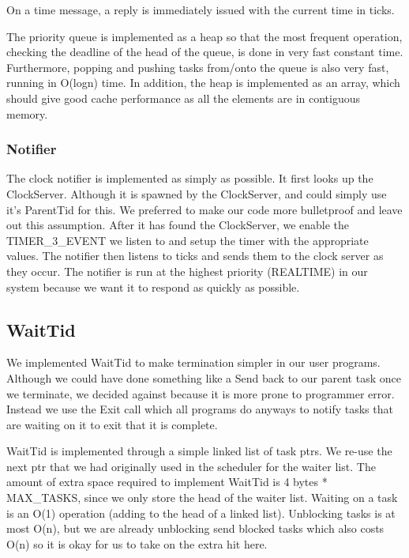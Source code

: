 \documentclass{article}
\begin{document}
On a time message, a reply is immediately issued with the current time in ticks.

The priority queue is implemented as a heap so that the most frequent operation, checking the deadline of the head of the queue, is done in very fast constant time. Furthermore, popping and pushing tasks from/onto the queue is also very fast, running in O(logn) time. In addition, the heap is implemented as an array, which should give good cache performance as all the elements are in contiguous memory.

\subsubsection{Notifier}

The clock notifier is implemented as simply as possible. It first looks up the ClockServer. Although it is spawned by the ClockServer, and could simply use it's ParentTid for this. We preferred to make our code more bulletproof and leave out this assumption. After it has found the ClockServer, we enable the TIMER\_3\_EVENT we listen to and setup the timer with the appropriate values. The notifier then listens to ticks and sends them to the clock server as they occur. The notifier is run at the highest priority (REALTIME) in our system because we want it to respond as quickly as possible.

\subsection{WaitTid}

We implemented WaitTid to make termination simpler in our user programs. Although we could have done something like a Send back to our parent task once we terminate, we decided against because it is more prone to programmer error. Instead we use the Exit call which all programs do anyways to notify tasks that are waiting on it to exit that it is complete.

WaitTid is implemented through a simple linked list of task ptrs. We re-use the next ptr that we had originally used in the scheduler for the waiter list. The amount of extra space required to implement WaitTid is 4 bytes * MAX\_TASKS, since we only store the head of the waiter list. Waiting on a task is an O(1) operation (adding to the head of a linked list). Unblocking tasks is at most O(n), but we are already unblocking send blocked tasks which also costs O(n) so it is okay for us to take on the extra hit here.
\end{document}
